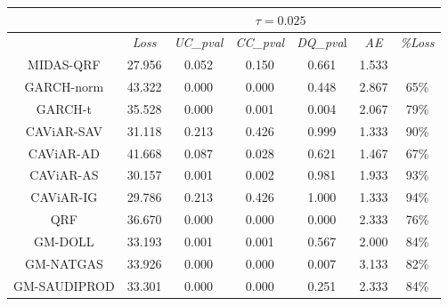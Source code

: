 \begin{table}[H]
\begin{tabular}{ccccccc}
                                                                                                  & \multicolumn{6}{c}{$\tau=0.025$}                         \\ \hline
                                                                                                  & \textit{Loss}   & \textit{UC\_pval} & \textit{CC\_pval} & \textit{DQ\_pva}l & \textit{AE}    & \textit{\%Loss} \\ \hline
\rowcolor[HTML]{D9D9D9} MIDAS-QRF                                            & 27.956 & 0.052    & 0.150    & 0.661    & 1.533 &        \\
GARCH-norm                                                                                        & 43.322 & 0.000    & 0.000    & 0.448    & 2.867 & 65\%   \\
GARCH-t                                                                                           & 35.528 & 0.000    & 0.001    & 0.004    & 2.067 & 79\%   \\
\rowcolor[HTML]{D9D9D9} CAViAR-SAV                                           & 31.118 & 0.213    & 0.426    & 0.999    & 1.333 & 90\%   \\
\rowcolor[HTML]{D9D9D9}CAViAR-AD                                                                                         & 41.668 & 0.087    & 0.028    & 0.621    & 1.467 & 67\%   \\
CAViAR-AS                                                                                         & 30.157 & 0.001    & 0.002    & 0.981    & 1.933 & 93\%   \\
\rowcolor[HTML]{D9D9D9} CAViAR-IG                                            & 29.786 & 0.213    & 0.426    & 1.000    & 1.333 & 94\%   \\
QRF                                                                                               & 36.670 & 0.000    & 0.000    & 0.000    & 2.333 & 76\%   \\
GM-DOLL                                                                                           & 33.193 & 0.001    & 0.001    & 0.567    & 2.000 & 84\%   \\
GM-NATGAS                                                                                         & 33.926 & 0.000    & 0.000    & 0.007    & 3.133 & 82\%   \\
GM-SAUDIPROD                                                                                      & 33.301 & 0.000    & 0.000    & 0.251    & 2.333 & 84\%   \\ \hline

\end{tabular}
\end{table}

